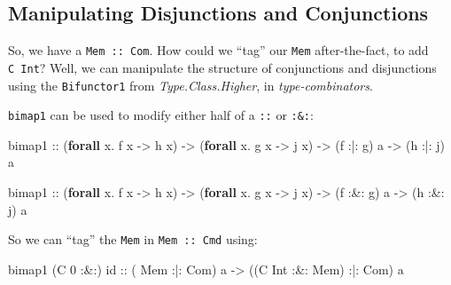 \documentclass[]{article}
\newenvironment{Shaded}{}{}
\newcommand{\DataTypeTok}[1]{\textcolor[rgb]{0.56,0.13,0.00}{#1}}
\newcommand{\DecValTok}[1]{\textcolor[rgb]{0.25,0.63,0.44}{#1}}
\newcommand{\FunctionTok}[1]{\textcolor[rgb]{0.02,0.16,0.49}{#1}}
\newcommand{\KeywordTok}[1]{\textcolor[rgb]{0.00,0.44,0.13}{\textbf{#1}}}
\newcommand{\NormalTok}[1]{#1}
\newcommand{\OperatorTok}[1]{\textcolor[rgb]{0.40,0.40,0.40}{#1}}
\newcommand{\OtherTok}[1]{\textcolor[rgb]{0.00,0.44,0.13}{#1}}
\begin{document}
\subsection{Manipulating Disjunctions and
Conjunctions}\label{manipulating-disjunctions-and-conjunctions}

So, we have a \texttt{Mem\ :\textbar{}:\ Com}. How could we ``tag'' our
\texttt{Mem} after-the-fact, to add \texttt{C\ Int}? Well, we can manipulate the
structure of conjunctions and disjunctions using the \texttt{Bifunctor1} from
\emph{Type.Class.Higher}, in \emph{type-combinators}.

\texttt{bimap1} can be used to modify either half of a \texttt{:\textbar{}:} or
\texttt{:\&:}:

\begin{Shaded}
\begin{Highlighting}[]
\NormalTok{bimap1}
\OtherTok{    ::}\NormalTok{ (}\KeywordTok{forall}\NormalTok{ x}\OperatorTok{.}\NormalTok{ f x }\OtherTok{{-}\textgreater{}}\NormalTok{ h x)}
    \OtherTok{{-}\textgreater{}}\NormalTok{ (}\KeywordTok{forall}\NormalTok{ x}\OperatorTok{.}\NormalTok{ g x }\OtherTok{{-}\textgreater{}}\NormalTok{ j x)}
    \OtherTok{{-}\textgreater{}}\NormalTok{ (f }\OperatorTok{:|:}\NormalTok{ g) a}
    \OtherTok{{-}\textgreater{}}\NormalTok{ (h }\OperatorTok{:|:}\NormalTok{ j) a}

\NormalTok{bimap1}
\OtherTok{    ::}\NormalTok{ (}\KeywordTok{forall}\NormalTok{ x}\OperatorTok{.}\NormalTok{ f x }\OtherTok{{-}\textgreater{}}\NormalTok{ h x)}
    \OtherTok{{-}\textgreater{}}\NormalTok{ (}\KeywordTok{forall}\NormalTok{ x}\OperatorTok{.}\NormalTok{ g x }\OtherTok{{-}\textgreater{}}\NormalTok{ j x)}
    \OtherTok{{-}\textgreater{}}\NormalTok{ (f }\OperatorTok{:\&:}\NormalTok{ g) a}
    \OtherTok{{-}\textgreater{}}\NormalTok{ (h }\OperatorTok{:\&:}\NormalTok{ j) a}
\end{Highlighting}
\end{Shaded}

So we can ``tag'' the \texttt{Mem} in \texttt{Mem\ :\textbar{}:\ Cmd} using:

\begin{Shaded}
\begin{Highlighting}[]
\NormalTok{bimap1 (}\DataTypeTok{C} \DecValTok{0} \OperatorTok{:\&:}\NormalTok{) }\FunctionTok{id}
\OtherTok{    ::}\NormalTok{ (      }\DataTypeTok{Mem}       \OperatorTok{:|:} \DataTypeTok{Com}\NormalTok{) a}
    \OtherTok{{-}\textgreater{}}\NormalTok{ ((}\DataTypeTok{C} \DataTypeTok{Int} \OperatorTok{:\&:} \DataTypeTok{Mem}\NormalTok{) }\OperatorTok{:|:} \DataTypeTok{Com}\NormalTok{) a}
\end{Highlighting}
\end{Shaded}
\end{document}
